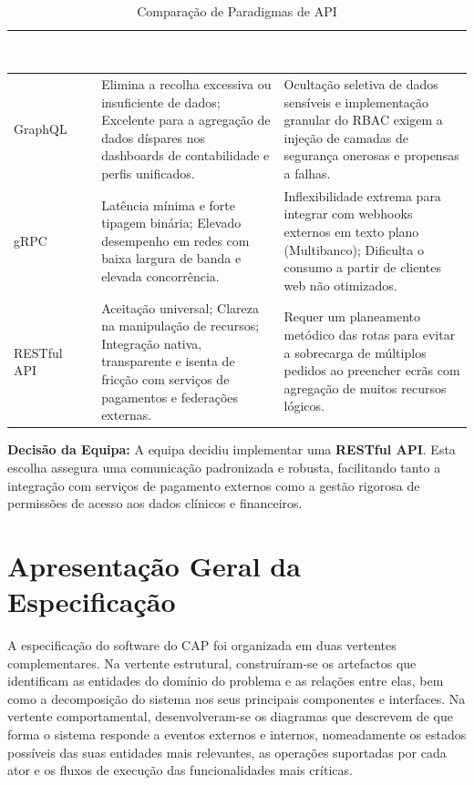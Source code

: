 \documentclass[a4paper,12pt]{scrreprt}
\begin{document}
{
\begin{table}[h]
\centering
\begin{tabular}{|p{3.5cm}|p{6cm}|p{6cm}|}
\hline
\rowcolor{headerblue}\textcolor{white}{\textbf{Paradigma de API}} & \textcolor{white}{\textbf{Vantagens}} & \textcolor{white}{\textbf{Desvantagens}} \\ \hline
GraphQL & Elimina a recolha excessiva ou insuficiente de dados; Excelente para a agregação de dados díspares nos dashboards de contabilidade e perfis unificados. & Ocultação seletiva de dados sensíveis e implementação granular do RBAC exigem a injeção de camadas de segurança onerosas e propensas a falhas. \\ \hline
gRPC & Latência mínima e forte tipagem binária; Elevado desempenho em redes com baixa largura de banda e elevada concorrência. & Inflexibilidade extrema para integrar com webhooks externos em texto plano (Multibanco); Dificulta o consumo a partir de clientes web não otimizados. \\ \hline
RESTful API & Aceitação universal; Clareza na manipulação de recursos; Integração nativa, transparente e isenta de fricção com serviços de pagamentos e federações externas. & Requer um planeamento metódico das rotas para evitar a sobrecarga de múltiplos pedidos ao preencher ecrãs com agregação de muitos recursos lógicos. \\ \hline
\end{tabular}
\caption{Comparação de Paradigmas de API}
\end{table}

\textbf{Decisão da Equipa:} A equipa decidiu implementar uma \textbf{RESTful API}. Esta escolha assegura uma comunicação padronizada e robusta, facilitando tanto a integração com serviços de pagamento externos como a gestão rigorosa de permissões de acesso aos dados clínicos e financeiros.

\section{Apresentação Geral da Especificação}

A especificação do software do CAP foi organizada em duas vertentes complementares. Na vertente estrutural, construíram-se os artefactos que identificam as entidades do domínio do problema e as relações entre elas, bem como a decomposição do sistema nos seus principais componentes e interfaces. Na vertente comportamental, desenvolveram-se os diagramas que descrevem de que forma o sistema responde a eventos externos e internos, nomeadamente os estados possíveis das suas entidades mais relevantes, as operações suportadas por cada ator e os fluxos de execução das funcionalidades mais críticas.

}
\end{document}
